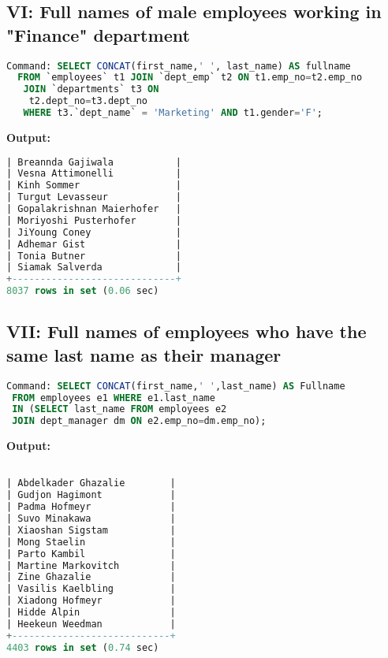 \documentclass[12pt]{report}
\begin{document}
\subsection*{VI: Full names of male employees working in "Finance" department}

\begin{lstlisting}[language=sql]
Command: SELECT CONCAT(first_name,' ', last_name) AS fullname
  FROM `employees` t1 JOIN `dept_emp` t2 ON t1.emp_no=t2.emp_no
   JOIN `departments` t3 ON
    t2.dept_no=t3.dept_no 
   WHERE t3.`dept_name` = 'Marketing' AND t1.gender='F';
\end{lstlisting}
\textbf{Output:}
\begin{lstlisting}[language=sql]
| Breannda Gajiwala           |
| Vesna Attimonelli           |
| Kinh Sommer                 |
| Turgut Levasseur            |
| Gopalakrishnan Maierhofer   |
| Moriyoshi Pusterhofer       |
| JiYoung Coney               |
| Adhemar Gist                |
| Tonia Butner                |
| Siamak Salverda             |
+-----------------------------+
8037 rows in set (0.06 sec)

\end{lstlisting}

\subsection*{VII: Full names of employees who have the same last name as
their manager}

\begin{lstlisting}[language=sql]
Command: SELECT CONCAT(first_name,' ',last_name) AS Fullname
 FROM employees e1 WHERE e1.last_name 
 IN (SELECT last_name FROM employees e2 
 JOIN dept_manager dm ON e2.emp_no=dm.emp_no);

\end{lstlisting}
\textbf{Output:}
\begin{lstlisting}[language=sql]

| Abdelkader Ghazalie        |
| Gudjon Hagimont            |
| Padma Hofmeyr              |
| Suvo Minakawa              |
| Xiaoshan Sigstam           |
| Mong Staelin               |
| Parto Kambil               |
| Martine Markovitch         |
| Zine Ghazalie              |
| Vasilis Kaelbling          |
| Xiadong Hofmeyr            |
| Hidde Alpin                |
| Heekeun Weedman            |
+----------------------------+
4403 rows in set (0.74 sec)

\end{lstlisting}
\end{document}
